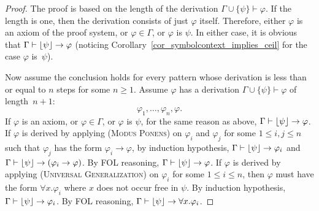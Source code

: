 \documentclass[acmsmall]{acmart}
\theoremstyle{acmdefinition}
\newcommand{\imp}{\to}
\newcommand{\prule}[1]{\textsc{(#1)}}
\newcommand{\modusponens}{\prule{Modus Ponens}\xspace}
\newcommand{\universalgeneralization}{\prule{Universal Generalization}\xspace}
\newcommand{\ddd}{,\dots,}
\DeclarePairedDelimiter{\floor}{\lfloor}{\rfloor}
\begin{document}
\begin{proof}
The proof is based on the length of
the derivation
$\Gamma \cup \{\psi\} \vdash \varphi$.
If the length is one, then the derivation consists of just
$\varphi$ itself.
Therefore, either $\varphi$ is an axiom of the proof system,
or $\varphi \in \Gamma$, or $\varphi$ is $\psi$.
In either case, it is obvious that
$\Gamma \vdash \floor{\psi} \to \varphi$
(noticing Corollary~\ref{cor_symbolcontext_implies_ceil}
 for the case $\varphi$ is~$\psi$).
 
Now assume the conclusion holds for every pattern whose derivation is less than 
or equal to $n$ steps for some $n \ge 1$.
Assume $\varphi$ has a derivation $\Gamma \cup \{\psi\} \vdash \varphi$
of length~$n+1$: 
$$\varphi_1 \ddd \varphi_n , \varphi.$$
If $\varphi$ is an axiom, or $\varphi \in \Gamma$,
or $\varphi$ is $\psi$,
for the same reason as above,
$\Gamma \vdash \floor{\psi} \imp \varphi$.
If $\varphi$ is derived by applying \modusponens
on $\varphi_i$ and $\varphi_j$ for some
$1 \le i, j \le n$
such that $\varphi_j$ has the form $\varphi_i \imp \varphi$,
by induction hypothesis,
$\Gamma \vdash \floor{\psi} \imp \varphi_i$
and
$\Gamma \vdash \floor{\psi} \imp (\varphi_i \imp \varphi)$.
By FOL reasoning,
$\Gamma \vdash \floor{\psi} \imp \varphi$.
If $\varphi$ is derived by applying \universalgeneralization
on $\varphi_i$ for some $1 \le i \le n$,
then $\varphi$ must have the form $\forall x . \varphi_i$
where $x$ does not occur free in $\psi$.
By induction hypothesis,
$\Gamma \vdash \floor{\psi} \imp \varphi_i$.
By FOL reasoning,
$\Gamma \vdash \floor{\psi} \imp \forall x . \varphi_i$.


\end{proof}
\end{document}

